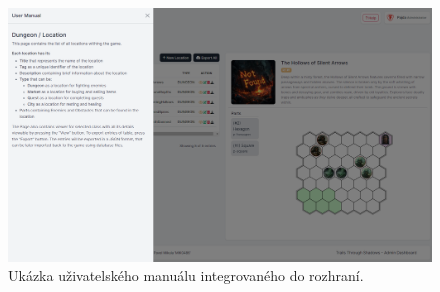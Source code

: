 \begin{figure}
    \centering
    \includegraphics[width=1.0\textwidth]{figures/dashboardUserManual}
    \caption{Ukázka uživatelského manuálu integrovaného do rozhraní.}
    \label{fig:interfaceScreenshotsUserManual}
\end{figure}

\endinput